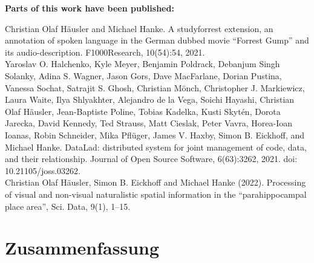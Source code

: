 \documentclass[english,12pt]{report}
\begin{document}
\begin{spacing}{1.5}
\noindent \textbf{Parts of this work have been published:}\\




\noindent Christian Olaf Häusler and Michael Hanke. A studyforrest extension, an
annotation of spoken language in the German dubbed movie “Forrest Gump” and its
audio-description. F1000Research, 10(54):54, 2021.\\

\noindent Yaroslav O. Halchenko, Kyle Meyer, Benjamin Poldrack, Debanjum Singh
Solanky, Adina S. Wagner, Jason Gors, Dave MacFarlane, Dorian Pustina, Vanessa
Sochat, Satrajit S. Ghosh, Christian Mönch, Christopher J. Markiewicz, Laura
Waite, Ilya Shlyakhter, Alejandro de la Vega, Soichi Hayashi, Christian Olaf
Häusler, Jean-Baptiste Poline, Tobias Kadelka, Kusti Skytén, Dorota Jarecka,
David Kennedy, Ted Strauss, Matt Cieslak, Peter Vavra, Horea-Ioan Ioanas, Robin
Schneider, Mika Pflüger, James V. Haxby, Simon B. Eickhoff, and Michael Hanke.
DataLad: distributed system for joint management of code, data, and their
relationship. Journal of Open Source Software, 6(63):3262, 2021. doi:
10.21105/joss.03262.\\

\noindent Christian Olaf Häusler, Simon B. Eickhoff and Michael Hanke (2022).
Processing of visual and non-visual naturalistic spatial information in the
``parahippocampal place area'', Sci. Data, 9(1), 1--15.




\chapter*{Zusammenfassung}
\setcounter{page}{1}




\end{spacing}
\end{document}
